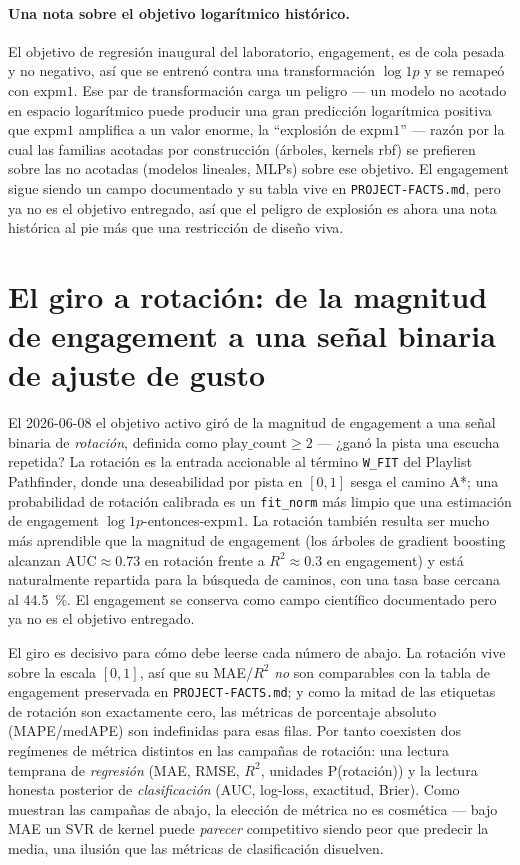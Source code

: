 \documentclass[11pt]{article}
\newcommand{\medape}{medAPE}
\newcommand{\rsq}{$R^2$}
\begin{document}
\paragraph{Una nota sobre el objetivo logarítmico histórico.} El objetivo de
regresión inaugural del laboratorio, engagement, es de cola pesada y no negativo,
así que se entrenó contra una transformación $\log1p$ y se remapeó con
$\text{expm1}$. Ese par de transformación carga un peligro --- un modelo no
acotado en espacio logarítmico puede producir una gran predicción logarítmica
positiva que $\text{expm1}$ amplifica a un valor enorme, la ``explosión de
$\text{expm1}$'' --- razón por la cual las familias acotadas por construcción
(árboles, kernels rbf) se prefieren sobre las no acotadas (modelos lineales,
MLPs) sobre ese objetivo. El engagement sigue siendo un campo documentado y su
tabla vive en \texttt{PROJECT-FACTS.md}, pero ya no es el objetivo entregado, así
que el peligro de explosión es ahora una nota histórica al pie más que una
restricción de diseño viva.

\section{El giro a rotación: de la magnitud de engagement a una señal binaria de ajuste de gusto}
\label{sec:rotation-pivot}
El 2026-06-08 el objetivo activo giró de la magnitud de engagement a una señal
binaria de \emph{rotación}, definida como $\text{play\_count} \ge 2$ --- ¿ganó la
pista una escucha repetida? La rotación es la entrada accionable al término
\texttt{W\_FIT} del Playlist Pathfinder, donde una deseabilidad por pista en
$[0,1]$ sesga el camino A*; una probabilidad de rotación calibrada es un
\texttt{fit\_norm} más limpio que una estimación de engagement
$\log1p$-entonces-$\text{expm1}$. La rotación también resulta ser mucho más
aprendible que la magnitud de engagement (los árboles de gradient boosting
alcanzan $\text{AUC}\approx 0.73$ en rotación frente a \rsq{}$\approx 0.3$ en
engagement) y está naturalmente repartida para la búsqueda de caminos, con una
tasa base cercana al \SI{44.5}{\percent}. El engagement se conserva como campo
científico documentado pero ya no es el objetivo entregado.

El giro es decisivo para cómo debe leerse cada número de abajo. La rotación vive
sobre la escala $[0,1]$, así que su MAE/\rsq{} \emph{no} son comparables con la
tabla de engagement preservada en \texttt{PROJECT-FACTS.md}; y como la mitad de
las etiquetas de rotación son exactamente cero, las métricas de porcentaje
absoluto (MAPE/\medape{}) son indefinidas para esas filas. Por tanto coexisten
dos regímenes de métrica distintos en las campañas de rotación: una lectura
temprana de \emph{regresión} (MAE, RMSE, \rsq{}, unidades P(rotación)) y la
lectura honesta posterior de \emph{clasificación} (AUC, log-loss, exactitud,
Brier). Como muestran las campañas de abajo, la elección de métrica no es
cosmética --- bajo MAE un SVR de kernel puede \emph{parecer} competitivo siendo
peor que predecir la media, una ilusión que las métricas de clasificación
disuelven.
\end{document}
